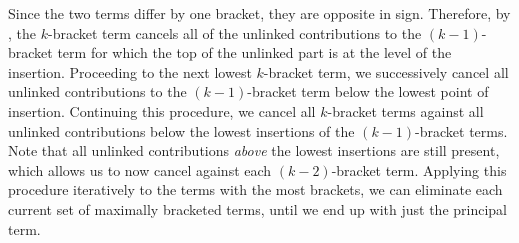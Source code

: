 \documentclass[11pt,fleqn]{article}
\numberwithin{equation}{section}
\begin{document}
\begin{thm}
{\begin{lem}
{    Since the two terms differ by one bracket, they are opposite in sign.
    Therefore, by , the $k$-bracket term cancels all of the unlinked contributions to the $(k-1)$-bracket term for which the top of the unlinked part is at the level of the insertion.
    Proceeding to the next lowest $k$-bracket term, we successively cancel all unlinked contributions to the $(k-1)$-bracket term below the lowest point of insertion.
    Continuing this procedure, we cancel all $k$-bracket terms against all unlinked contributions below the lowest insertions of the $(k-1)$-bracket terms.
    Note that all unlinked contributions \emph{above} the lowest insertions are still present, which allows us to now cancel against each $(k-2)$-bracket term.    
    Applying this procedure iteratively to the terms with the most brackets, we can eliminate each current set of maximally bracketed terms, until we end up with just the principal term.
  }
  \end{lem}
}
\end{thm}
\end{document}
